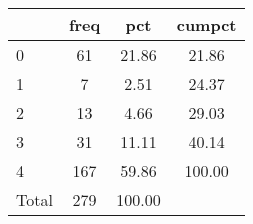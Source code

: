 {
\def\sym#1{\ifmmode^{#1}\else\(^{#1}\)\fi}
\begin{tabular}{l*{1}{ccc}}
\hline\hline
            &        freq&         pct&      cumpct\\
\hline
0           &          61&       21.86&       21.86\\
1           &           7&        2.51&       24.37\\
2           &          13&        4.66&       29.03\\
3           &          31&       11.11&       40.14\\
4           &         167&       59.86&      100.00\\
Total       &         279&      100.00&            \\
\hline\hline
\end{tabular}
}
